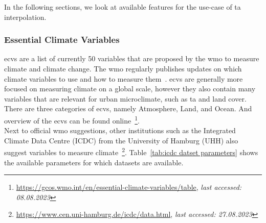 In the following sections, we look at available features for the use-case of \gls{ta} interpolation.

\subsubsection{Essential Climate Variables}

\gls{ecv}s are a list of currently 50 variables that are proposed by the \gls{wmo} to measure climate and climate change. The \gls{wmo} regularly publishes updates on which climate variables to use and how to measure them~\cite{wmo2018guide}. \gls{ecv}s are generally more focused on measuring climate on a global scale, however they also contain many variables that are relevant for urban microclimate, such as \gls{ta} and land cover. There are three categories of \gls{ecv}s, namely Atmosphere, Land, and Ocean. And overview of the \gls{ecv}s can be found online~\footnote{\url{https://gcos.wmo.int/en/essential-climate-variables/table}, \textit{last accessed: 08.08.2023}}.\\
Next to official \gls{wmo} suggestions, other institutions such as the Integrated Climate Data Centre (ICDC) from the University of Hamburg (UHH) also suggest variables to measure climate~\footnote{\url{https://www.cen.uni-hamburg.de/icdc/data.html}, \textit{last accessed: 27.08.2023}}. Table~\ref{tab:icdc datset parameters} shows the available parameters for which datasets are available.

